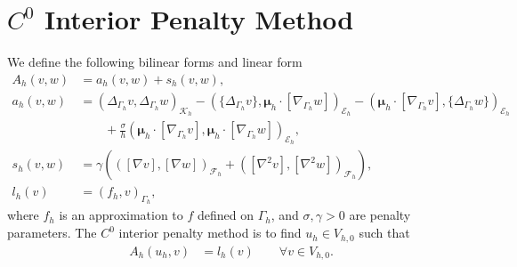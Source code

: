 \documentclass[10pt, a4paper]{amsart}
\newcommand{\bn}{{\bm n}}
\newcommand{\nab}{\nabla}
\newcommand{\bmu}{{\bm \mu}}
\newcommand{\calE}{\mathcal{E}}
\newcommand{\calF}{\mathcal{F}}
\newcommand{\calK}{\mathcal{K}}
\theoremstyle{definition}
\theoremstyle{remark}
\theoremstyle{example}
\numberwithin{equation}{section}
\begin{document}

\section{$C^0$ Interior Penalty Method}\label{sec-Method}
%
We define the following bilinear forms and linear form
\begin{align}
\label{eqn:AhDef}A_h(v, w)
& = a_h(v, w) + s_h(v, w), \\
\label{eqn:ahDef}a_h(v, w)
& = (\Delta_{\Gamma_h}v, \Delta_{\Gamma_h}w)_{\calK_h} - (\{\Delta_{\Gamma_h}v\}, \bmu_h \cdot [\nab_{\Gamma_h}w])_{\calE_h} -(\bmu_h \cdot [\nab_{\Gamma_h}v], \{\Delta_{\Gamma_h}w\})_{\calE_h} \\
& \qquad + \frac{\sigma}{h}(\bmu_h\cdot [\nab_{\Gamma_h}v], \bmu_h \cdot [\nab_{\Gamma_h}w])_{\calE_h}, \\
\label{eqn:shDef}s_h(v, w)
& = %
\gamma \left(([\nab v], [\nab w])_{\calF_h} + ([\nab^2v], [\nab^2w])_{\calF_h}\right), \\
l_h(v)
& = (f_h, v)_{\Gamma_h},
\end{align}
where $f_h$ is an approximation to $f$ defined on $\Gamma_h$,
and $\sigma,\gamma>0$ are penalty parameters. 
The $C^0$ interior penalty method is to find $u_h \in V_{h, 0}$ such that
\begin{align}
A_h(u_h, v)
& = l_h(v) \qquad \forall v \in V_{h, 0}. \label{disc-prob}
\end{align}
\end{document}
